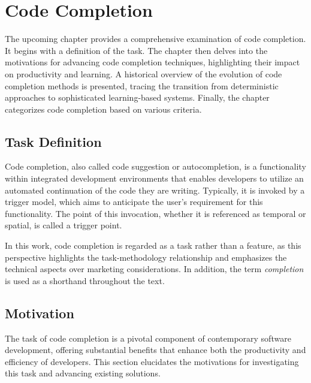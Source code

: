 \chapter{Code Completion}

The upcoming chapter provides a comprehensive examination of code completion. It begins with a definition of the task. The chapter then delves into the motivations for advancing code completion techniques, highlighting their impact on productivity and learning. A historical overview of the evolution of code completion methods is presented, tracing the transition from deterministic approaches to sophisticated learning-based systems. Finally, the chapter categorizes code completion based on various criteria.

\section{Task Definition}

Code completion, also called code suggestion or autocompletion, is a functionality within integrated development environments that enables developers to utilize an automated continuation of the code they are writing. Typically, it is invoked by a trigger model, which aims to anticipate the user's requirement for this functionality. The point of this invocation, whether it is referenced as temporal or spatial, is called a trigger point.

In this work, code completion is regarded as a task rather than a feature, as this perspective highlights the task-methodology relationship and emphasizes the technical aspects over marketing considerations. In addition, the term \textit{completion} is used as a shorthand throughout the text.

\section{Motivation}

The task of code completion is a pivotal component of contemporary software development, offering substantial benefits that enhance both the productivity and efficiency of developers. This section elucidates the motivations for investigating this task and advancing existing solutions.

